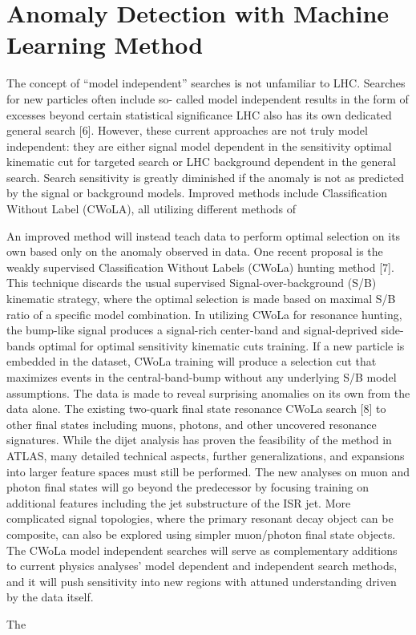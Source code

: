 \section{Anomaly Detection with Machine Learning Method}
The concept of “model independent” searches is not unfamiliar to LHC. Searches for new particles often include so- called model independent results in the form of excesses beyond certain statistical significance LHC also has its own dedicated general search [6]. However, these current approaches are not truly model independent: they are either signal model dependent in the sensitivity optimal kinematic cut for targeted search or LHC background dependent in the general search. Search sensitivity
is greatly diminished if the anomaly is not as predicted by the signal or background models. Improved methods include Classification Without Label (CWoLA), all utilizing different methods of 

An improved method will instead teach data to perform optimal selection on its own based only on the anomaly observed in data. One recent proposal is the weakly supervised Classification Without Labels (CWoLa) hunting method [7]. This technique discards the usual supervised Signal-over-background (S/B) kinematic strategy, where the optimal selection is made based on maximal S/B ratio of a specific model combination. In utilizing CWoLa for resonance hunting, the bump-like signal produces a signal-rich center-band and signal-deprived side-bands optimal for optimal sensitivity kinematic cuts training. If a new particle is embedded in the dataset, CWoLa training will produce a selection cut that maximizes events in the central-band-bump without any underlying S/B model assumptions. The data is made to reveal surprising anomalies on its own from the data alone.
The existing two-quark final state resonance CWoLa search [8] to other final states including muons, photons, and other uncovered resonance signatures. While the dijet analysis has proven the feasibility of the method in ATLAS, many detailed technical aspects, further generalizations, and expansions into larger feature spaces must still be performed. The new analyses on muon and photon final states will go beyond the predecessor by focusing training on additional features including the jet substructure of the ISR jet. More complicated signal topologies, where the primary resonant decay object can be composite, can also be explored using simpler muon/photon final state objects. The CWoLa model independent searches will serve as complementary additions to current physics analyses’ model dependent and independent search methods, and it will push sensitivity into new regions with attuned understanding driven by the data itself.


The 
